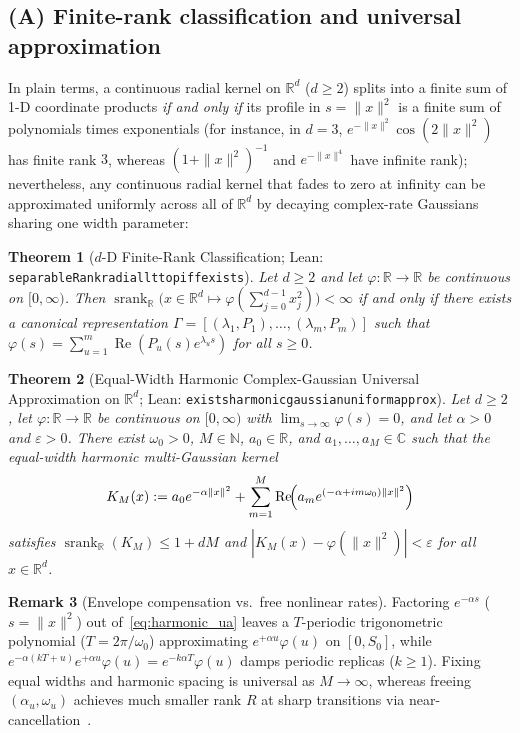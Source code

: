 \documentclass[11pt,a4paper]{article}
\theoremstyle{plain}
\newtheorem{theorem}{Theorem}[section]
\theoremstyle{definition}
\newtheorem{remark}[theorem]{Remark}
\newcommand{\R}{\mathbb{R}}
\newcommand{\C}{\mathbb{C}}
\newcommand{\N}{\mathbb{N}}
\DeclareMathOperator{\RePart}{Re}
\DeclareMathOperator{\srank}{srank}
\DeclareRobustCommand{\leanid}[1]{{\def\_{\textunderscore\allowbreak}\texttt{#1}}}
\begin{document}
\subsection{(A) Finite-rank classification and universal approximation}\label{sec:res_class}

In plain terms, a continuous radial kernel on $\R^d$ ($d \ge 2$) splits into a finite sum of 1-D coordinate products \emph{if and only if} its profile in $s = \|x\|^2$ is a finite sum of polynomials times exponentials (for instance, in $d = 3$, $e^{-\|x\|^2}\cos(2\|x\|^2)$ has finite rank $3$, whereas $(1 + \|x\|^2)^{-1}$ and $e^{-\|x\|^4}$ have infinite rank); nevertheless, any continuous radial kernel that fades to zero at infinity can be approximated uniformly across all of $\R^d$ by decaying complex-rate Gaussians sharing one width parameter:

\begin{theorem}[$d$-D Finite-Rank Classification; Lean: \leanid{separableRank\_radial\_lt\_top\_iff\_exists}]\label{thm:classification}
Let $d \ge 2$ and let $\varphi : \R \to \R$ be continuous on $[0,\infty)$. Then $\srank_{\R}\bigl(x \in \R^d \mapsto \varphi(\sum_{j=0}^{d-1} x_j^2)\bigr) < \infty$ if and only if there exists a canonical representation $\Gamma = [(\lambda_1, P_1), \dots, (\lambda_m, P_m)]$ such that $\varphi(s) = \sum_{u=1}^m \RePart(P_u(s)e^{\lambda_u s})$ for all $s \ge 0$.
\end{theorem}

\begin{theorem}[Equal-Width Harmonic Complex-Gaussian Universal Approximation on $\R^d$; Lean: \leanid{exists\_harmonic\_gaussian\_uniform\_approx}]\label{thm:universal_approx}
Let $d \ge 2$, let $\varphi : \R \to \R$ be continuous on $[0,\infty)$ with $\lim_{s \to \infty}\varphi(s) = 0$, and let $\alpha > 0$ and $\varepsilon > 0$. There exist $\omega_0 > 0$, $M \in \N$, $a_0 \in \R$, and $a_1, \dots, a_M \in \C$ such that the equal-width harmonic multi-Gaussian kernel
\begin{equation}\label{eq:harmonic_ua}
  K_M(x) := a_0 e^{-\alpha\|x\|^2} + \sum_{m=1}^{M} \RePart\!\Bigl(a_m e^{(-\alpha + i m\omega_0)\|x\|^2}\Bigr)
\end{equation}
satisfies $\srank_{\R}(K_M) \le 1 + d M$ and $|K_M(x) - \varphi(\|x\|^2)| < \varepsilon$ for all $x \in \R^d$.
\end{theorem}

\begin{remark}[Envelope compensation vs.\ free nonlinear rates]\label{rem:universal_tradeoff}
Factoring $e^{-\alpha s}$ ($s = \|x\|^2$) out of~\eqref{eq:harmonic_ua} leaves a $T$-periodic trigonometric polynomial ($T = 2\pi/\omega_0$) approximating $e^{+\alpha u}\varphi(u)$ on $[0, S_0]$, while $e^{-\alpha(kT + u)}e^{+\alpha u}\varphi(u) = e^{-k\alpha T}\varphi(u)$ damps periodic replicas ($k \ge 1$). Fixing equal widths and harmonic spacing is universal as $M \to \infty$, whereas freeing $(\alpha_u, \omega_u)$ achieves much smaller rank $R$ at sharp transitions via near-cancellation~\cite{braess1986nonlinear,niemitalo_kernel_optimizer}.
\end{remark}
\end{document}
